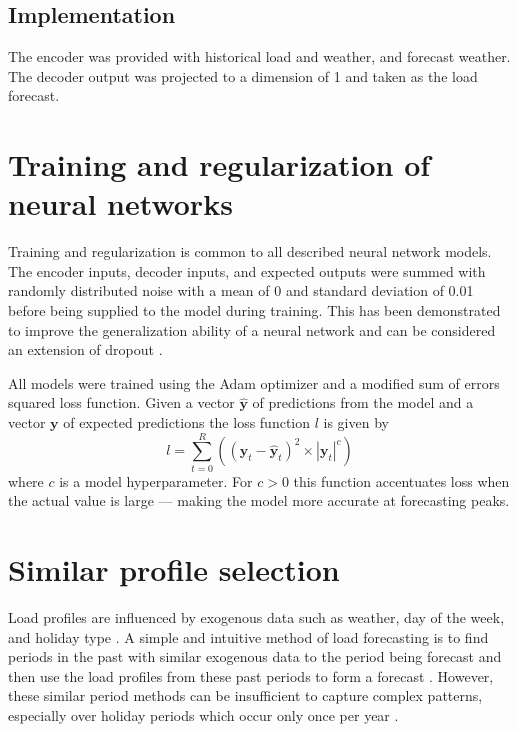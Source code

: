 \subsection{Implementation}
The encoder was provided with historical load and weather, and forecast weather.
The decoder output was projected to a dimension of 1 and taken as the load forecast.


\section{Training and regularization of neural networks}
\label{train-reg}
Training and regularization is common to all described neural network models.
The encoder inputs, decoder inputs, and expected outputs were summed with randomly distributed noise with a mean of 0 and standard deviation of 0.01 before being supplied to the model during training.
This has been demonstrated to improve the generalization ability of a neural network \cite{Wang1999} \cite{Brown2003} and can be considered an extension of dropout \cite{srivastava14a}.

All models were trained using the Adam optimizer \cite{Kingma2014} and a modified sum of errors squared loss function.
Given a vector $\boldsymbol{\hat{y}}$ of predictions from the model and a vector $\boldsymbol{y}$ of expected predictions the loss function $l$ is given by 
\begin{equation}
l = \sum_{t=0}^{R}((\boldsymbol{y}_t - \boldsymbol{\hat{y}}_t)^2 \times |\boldsymbol{y}_t|^c)
\end{equation}
where $c$ is a model hyperparameter.
For $c>0$ this function accentuates loss when the actual value is large --- making the model more accurate at forecasting peaks.


\section{Similar profile selection} \label{simperiod}
Load profiles are influenced by exogenous data such as weather, day of the week, and holiday type \cite{Weron2006}.
A simple and intuitive method of load forecasting is to find periods in the past with similar exogenous data to the period being forecast and then use the load profiles from these past periods to form a forecast \cite{Senjyu1998}.
However, these similar period methods can be insufficient to capture complex patterns, especially over holiday periods which occur only once per year \cite{Chen2010}.


